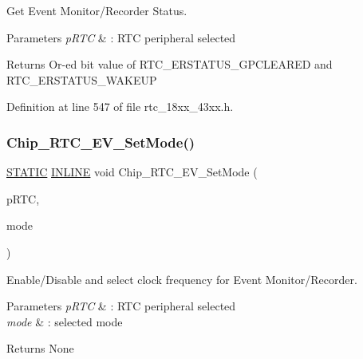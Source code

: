 Get Event Monitor/\+Recorder Status. 


\begin{DoxyParams}{Parameters}
{\em p\+R\+TC} & \+: R\+TC peripheral selected \\
\hline
\end{DoxyParams}
\begin{DoxyReturn}{Returns}
Or-\/ed bit value of R\+T\+C\+\_\+\+E\+R\+S\+T\+A\+T\+U\+S\+\_\+\+G\+P\+C\+L\+E\+A\+R\+ED and R\+T\+C\+\_\+\+E\+R\+S\+T\+A\+T\+U\+S\+\_\+\+W\+A\+K\+E\+UP 
\end{DoxyReturn}


Definition at line 547 of file rtc\+\_\+18xx\+\_\+43xx.\+h.

\mbox{\label{group___r_t_c__18_x_x__43_x_x_ga6b1011cc2afb90d24e7b63eccea42564}} 
\subsubsection{\texorpdfstring{Chip\+\_\+\+R\+T\+C\+\_\+\+E\+V\+\_\+\+Set\+Mode()}{Chip\_RTC\_EV\_SetMode()}}
{\footnotesize\ttfamily \hyperlink{group___l_p_c___types___public___macros_ga10b2d890d871e1489bb02b7e70d9bdfb}{S\+T\+A\+T\+IC} \hyperlink{spifi__18xx__43xx_8h_a2eb6f9e0395b47b8d5e3eeae4fe0c116}{I\+N\+L\+I\+NE} void Chip\+\_\+\+R\+T\+C\+\_\+\+E\+V\+\_\+\+Set\+Mode (\begin{DoxyParamCaption}\item[{\hyperlink{struct_l_p_c___r_t_c___t}{L\+P\+C\+\_\+\+R\+T\+C\+\_\+T} $\ast$}]{p\+R\+TC,  }\item[{\hyperlink{group___r_t_c__18_x_x__43_x_x_gabcbfff4a7d52791dc0b1cdcb078a2a05}{R\+T\+C\+\_\+\+E\+V\+\_\+\+M\+O\+D\+E\+\_\+T}}]{mode }\end{DoxyParamCaption})}



Enable/\+Disable and select clock frequency for Event Monitor/\+Recorder. 


\begin{DoxyParams}{Parameters}
{\em p\+R\+TC} & \+: R\+TC peripheral selected \\
\hline
{\em mode} & \+: selected mode \\
\hline
\end{DoxyParams}
\begin{DoxyReturn}{Returns}
None 
\end{DoxyReturn}



